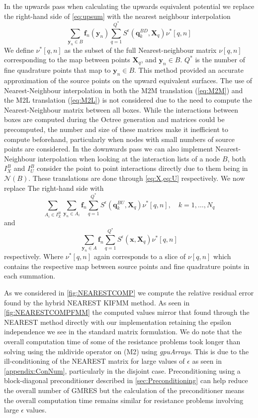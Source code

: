 In the upwards pass when calculating the upwards equivalent potential we replace the right-hand side of \cref{eq:upsum} with the nearest neighbour interpolation
\begin{equation*}
    \sum_{{\bm{y}}_{n} \in B} \bm{f}_{n}({\bm{y}}_n) \sum_{q=1}^{Q^*}S^{\epsilon}\left({\bm{q}}^{BD}_{k}, {\bm{X}}_{q}\right) \nu^*[q,n]
\end{equation*}
We define $\nu^*[q,n]$ as the subset of the full Nearest-neighbour matrix $\nu[q,n]$ corresponding to the map between points ${\bm{X}}_{q}$, and ${\bm{y}}_{n} \in B$. $Q^*$ is the number of fine quadrature points that map to ${\bm{y}}_{n} \in B$. This method provided an accurate approximation of the source points on the upward equivalent surfaces. The use of Nearest-Neighbour interpolation in both the M2M translation (\cref{eq:M2M}) and the M2L translation (\cref{eq:M2L}) is not considered due to the need to compute the Nearest-Neighbour matrix between all boxes. While the interactions between boxes are computed during the Octree generation and matrices could be precomputed, the number and size of these matrices make it inefficient to compute beforehand, particularly when nodes with small numbers of source points are considered. 
In the downwards pass we can also implement Nearest-Neighbour interpolation when looking at the interaction lists of a node $B$, both $I_X^B$ and $I_U^B$ consider the point to point interactions directly due to them being in $\mathcal{N}(B)$. These translations are done through \cref{eq:X,eq:U} respectively. We now replace The right-hand side with 
\begin{equation*}
    \sum_{A_i \in I_X^B} \sum_{{\bm{y}}_n\in A_i} {\bm{f}}_{n} \sum_{q=1}^{Q^*} S^\epsilon\left(\bm{q}^{BU}_{k}, {\bm{X}}_{q}\right) \nu^*[q,n], \quad k=1,\dots,N_q
\end{equation*}
and
\begin{equation*}
    \sum_{{\bm{y}}_n\in A}{\bm{f}}_n \sum_{q=1}^{Q^*} S^\epsilon(\bm{x},{\bm{X}}_q) \nu^*[q,n]
\end{equation*}
respectively. Where $\nu^*[q,n]$ again corresponds to a slice of $\nu[q,n]$ which contains the respective map between source points and fine quadrature points in each summation.

As we considered in \cref{fig:NEARESTCOMP} we compute the relative residual error found by the hybrid NEAREST KIFMM method. As seen in \cref{fig:NEARESTCOMPFMM} the computed values mirror that found through the NEAREST method directly with our implementation retaining the epsilon independence we see in the standard matrix formulation. We do note that the overall computation time of some of the resistance problems took longer than solving using the mldivide operator on (M2) using \textit{gpuArrays}. This is due to the ill-conditioning of the NEAREST matrix for large values of $\epsilon$ as seen in \cref{appendix:ConNum}, particularly in the disjoint case. Preconditioning using a block-diagonal preconditioner described in \cref{sec:Preconditioning} can help reduce the overall number of GMRES but the calculation of the preconditioner means the overall computation time remains similar for resistance problems involving large $\epsilon$ values. 

